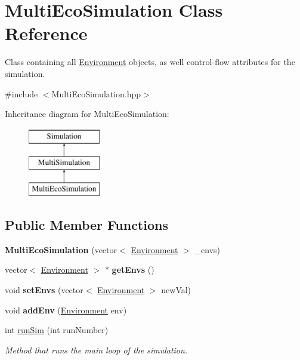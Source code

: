 \hypertarget{classMultiEcoSimulation}{}\section{Multi\+Eco\+Simulation Class Reference}
\label{classMultiEcoSimulation}


Class containing all \hyperlink{classEnvironment}{Environment} objects, as well control-\/flow attributes for the simulation.  




{\ttfamily \#include $<$Multi\+Eco\+Simulation.\+hpp$>$}

Inheritance diagram for Multi\+Eco\+Simulation\+:\begin{figure}[H]
\begin{center}
\leavevmode
\includegraphics[height=3.000000cm]{classMultiEcoSimulation}
\end{center}
\end{figure}
\subsection*{Public Member Functions}
\begin{DoxyCompactItemize}
\item 
\mbox{\label{classMultiEcoSimulation_af8a850bdfb77405c1e93b1f6549e36d8}} 
{\bfseries Multi\+Eco\+Simulation} (vector$<$ \hyperlink{classEnvironment}{Environment} $>$ \+\_\+envs)
\item 
\mbox{\label{classMultiEcoSimulation_a6bff1bcc1a05b2fdabfd3885ad62022f}} 
vector$<$ \hyperlink{classEnvironment}{Environment} $>$ $\ast$ {\bfseries get\+Envs} ()
\item 
\mbox{\label{classMultiEcoSimulation_a94ebc91936e91b516d4bd442b80a472e}} 
void {\bfseries set\+Envs} (vector$<$ \hyperlink{classEnvironment}{Environment} $>$ new\+Val)
\item 
\mbox{\label{classMultiEcoSimulation_ae8dd59a797f43d0fffd34ec3cdc06728}} 
void {\bfseries add\+Env} (\hyperlink{classEnvironment}{Environment} env)
\item 
int \hyperlink{classMultiEcoSimulation_ad490e089c083d06d80c62af9e1564ac3}{run\+Sim} (int run\+Number)
\begin{DoxyCompactList}\small\item\em Method that runs the main loop of the simulation. \end{DoxyCompactList}\end{DoxyCompactItemize}
